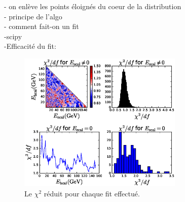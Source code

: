 \documentclass[11pt,a4paper]{article}
\begin{document}
- on enlève les points éloignés du coeur de la distribution\\
- principe de l'algo\\
- comment fait-on un fit\\
-scipy \cite{scipyFit}\\
-{Efficacité du fit}:
\begin{figure}[!h]
\begin{center}
\includegraphics[width=0.7\textwidth]{images/pictures/testKNNGC/KNNGaussianCleaning_chi2_calib.eps}
\caption{Le $\chi^2$ réduit pour chaque fit effectué.}
\end{center}
\end{figure}
\end{document}
